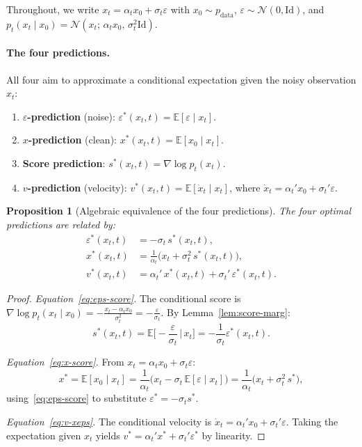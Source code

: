 \documentclass[11pt]{article}
\newcommand{\E}{\mathbb{E}}
\newcommand{\cN}{\mathcal{N}}
\newcommand{\grad}{\nabla}
\newcommand{\Id}{\mathrm{Id}}
\newtheorem{proposition}[theorem]{Proposition}
\theoremstyle{definition}
\theoremstyle{remark}
\begin{document}
Throughout, we write $x_t = \alpha_t x_0 + \sigma_t\varepsilon$ with $x_0\sim p_{\mathrm{data}}$, $\varepsilon\sim\cN(0,\Id)$, and $p_t(x_t\mid x_0) = \cN(x_t;\,\alpha_t x_0,\,\sigma_t^2\Id)$.

\paragraph{The four predictions.}
All four aim to approximate a conditional expectation given the noisy observation $x_t$:
\begin{enumerate}[nosep,leftmargin=18pt]
\item \textbf{$\varepsilon$-prediction} (noise): $\varepsilon^*(x_t,t) = \E[\varepsilon\mid x_t]$.
\item \textbf{$x$-prediction} (clean): $x^*(x_t,t) = \E[x_0\mid x_t]$.
\item \textbf{Score prediction}: $s^*(x_t,t) = \grad\log p_t(x_t)$.
\item \textbf{$v$-prediction} (velocity): $v^*(x_t,t) = \E[\dot{x}_t\mid x_t]$, where $\dot{x}_t = \alpha_t' x_0 + \sigma_t'\varepsilon$.
\end{enumerate}

\begin{proposition}[Algebraic equivalence of the four predictions]\label{prop:four-equiv}
The four optimal predictions are related by:
\begin{align}
\varepsilon^*(x_t,t) &= -\sigma_t\,s^*(x_t,t), \label{eq:eps-score}\\
x^*(x_t,t) &= \frac{1}{\alpha_t}\big(x_t + \sigma_t^2\,s^*(x_t,t)\big), \label{eq:x-score}\\
v^*(x_t,t) &= \alpha_t'\,x^*(x_t,t) + \sigma_t'\,\varepsilon^*(x_t,t). \label{eq:v-xeps}
\end{align}
\end{proposition}

\begin{proof}
\emph{Equation~\eqref{eq:eps-score}.}
The conditional score is $\grad\log p_t(x_t\mid x_0) = -\frac{x_t - \alpha_t x_0}{\sigma_t^2} = -\frac{\varepsilon}{\sigma_t}$.
By Lemma~\ref{lem:score-marg}:
\[
s^*(x_t,t) = \E\!\Big[-\frac{\varepsilon}{\sigma_t}\,\Big|\,x_t\Big] = -\frac{1}{\sigma_t}\varepsilon^*(x_t,t).
\]

\emph{Equation~\eqref{eq:x-score}.}
From $x_t = \alpha_t x_0 + \sigma_t\varepsilon$:
\[
x^* = \E[x_0\mid x_t] = \frac{1}{\alpha_t}\big(x_t - \sigma_t\,\E[\varepsilon\mid x_t]\big) = \frac{1}{\alpha_t}\big(x_t + \sigma_t^2\,s^*\big),
\]
using~\eqref{eq:eps-score} to substitute $\varepsilon^* = -\sigma_t s^*$.

\emph{Equation~\eqref{eq:v-xeps}.}
The conditional velocity is $\dot{x}_t = \alpha_t' x_0 + \sigma_t'\varepsilon$.
Taking the expectation given $x_t$ yields $v^* = \alpha_t' x^* + \sigma_t'\varepsilon^*$ by linearity.
\end{proof}
\end{document}
